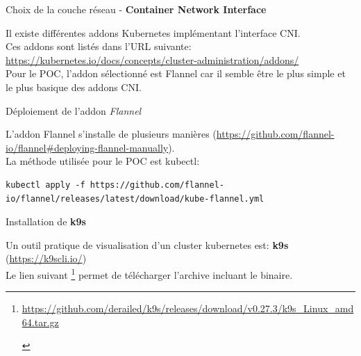 
\begin{frame}[fragile]{Choix de la couche réseau - \textbf{Container Network Interface}}

   Il existe différentes addons Kubernetes implémentant l'interface CNI.\\
   Ces addons sont listés dans l'URL suivante: \url{https://kubernetes.io/docs/concepts/cluster-administration/addons/}\\
   Pour le POC, l'addon sélectionné est Flannel car il semble être le plus simple et le plus basique des addons CNI.\\

\end{frame}


\begin{frame}[fragile]{Déploiement de l'addon \textit{Flannel}}

   L'addon Flannel s'installe de plusieurs manières (\url{https://github.com/flannel-io/flannel#deploying-flannel-manually}).\\
   La méthode utilisée pour le POC est kubectl:

\begin{tiny}
\begin{Verbatim}[commandchars=\\\{\}]
kubectl apply -f https://github.com/flannel-io/flannel/releases/latest/download/kube-flannel.yml
\end{Verbatim}
\end{tiny}

\end{frame}


\begin{frame}[fragile]{Installation de \textbf{k9s}}

   Un outil pratique de visualisation d'un cluster kubernetes est: \textbf{k9s} (\url{https://k9scli.io/})\\
   Le lien suivant \footnote{
\begin{tcolorbox}
   \tiny{\url{https://github.com/derailed/k9s/releases/download/v0.27.3/k9s_Linux_amd64.tar.gz}}
\end{tcolorbox}
   } permet de télécharger l'archive incluant le binaire.



\end{frame}

